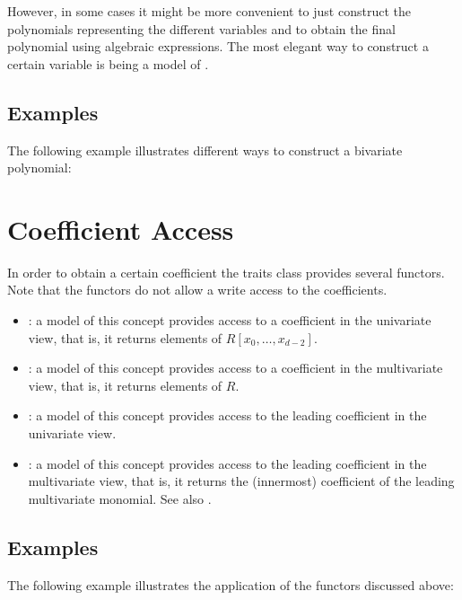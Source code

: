 However, in some cases it might be more convenient to just construct 
the polynomials representing the different variables and to obtain the 
final polynomial using 
algebraic expressions. The most elegant way to construct a certain variable is 
 being a model of 
. 

\subsection{Examples}

The following example illustrates different ways to construct a 
bivariate polynomial:



\section{Coefficient Access}
 
In order to obtain a certain coefficient the traits class provides 
several functors. 
Note that the functors do not allow a write access to the coefficients. 
\begin{itemize}
\item {}: 
a model of this concept provides access to a coefficient in the univariate view,
that is, it returns elements of $R[x_0,\dots,x_{d-2}]$.
\item {}: 
a model of this concept provides access to a coefficient in the multivariate 
view, that is, it returns elements of $R$.
\item {}: 
a model of this concept provides access to the leading coefficient in 
the univariate view. 
\item {}: 
a model of this concept provides access to the leading coefficient in 
the multivariate view, that is,
it returns the (innermost) coefficient of the leading multivariate monomial. 
See also  .          
\end{itemize}

\subsection{Examples}
The following example illustrates the application of the functors 
discussed above:


